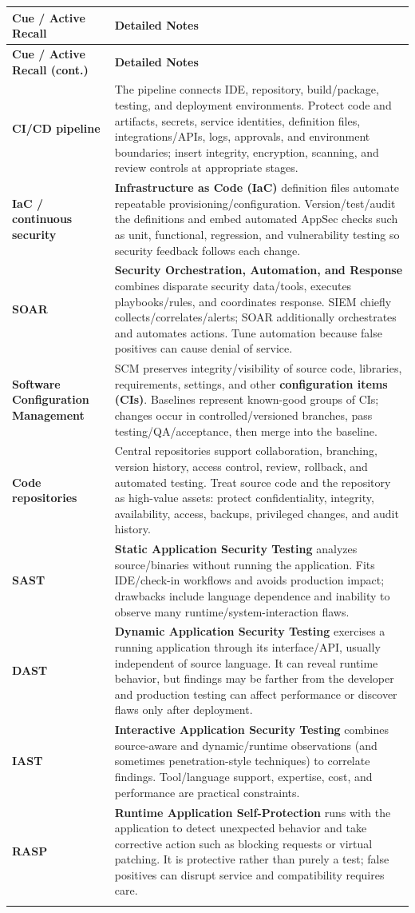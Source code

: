 \documentclass[10pt,letterpaper]{article}
\makeatletter
\newenvironment{cornell}{\rowcolors{2}{white}{notebg}\begin{longtable}{@{}>{\raggedright\arraybackslash\columncolor{cuebg}\color{navy}\bfseries}p{0.285\textwidth}>{\raggedright\arraybackslash}p{0.65\textwidth}@{}}\rowcolor{navy}\color{white}\textbf{Cue / Active Recall} & \color{white}\textbf{Detailed Notes}\\ \hline\endfirsthead\rowcolor{navy}\color{white}\textbf{Cue / Active Recall (cont.)} & \color{white}\textbf{Detailed Notes}\\ \hline\endhead}{\end{longtable}}
\newcommand{\noterow}[2]{#1 & #2\\\arrayrulecolor{line}\hline}\newcommand{\source}[1]{\par{\footnotesize\color{teal}\textit{Source: CBK, #1}}\par}
\makeatother
\begin{document}
\begin{cornell}
\noterow{CI/CD pipeline}{The pipeline connects IDE, repository, build/package, testing, and deployment environments. Protect code and artifacts, secrets, service identities, definition files, integrations/APIs, logs, approvals, and environment boundaries; insert integrity, encryption, scanning, and review controls at appropriate stages.}
\noterow{IaC / continuous security}{\textbf{Infrastructure as Code (IaC)} definition files automate repeatable provisioning/configuration. Version/test/audit the definitions and embed automated AppSec checks such as unit, functional, regression, and vulnerability testing so security feedback follows each change.}
\noterow{SOAR}{\textbf{Security Orchestration, Automation, and Response} combines disparate security data/tools, executes playbooks/rules, and coordinates response. SIEM chiefly collects/correlates/alerts; SOAR additionally orchestrates and automates actions. Tune automation because false positives can cause denial of service.}
\noterow{Software Configuration Management}{SCM preserves integrity/visibility of source code, libraries, requirements, settings, and other \textbf{configuration items (CIs)}. Baselines represent known-good groups of CIs; changes occur in controlled/versioned branches, pass testing/QA/acceptance, then merge into the baseline.}
\noterow{Code repositories}{Central repositories support collaboration, branching, version history, access control, review, rollback, and automated testing. Treat source code and the repository as high-value assets: protect confidentiality, integrity, availability, access, backups, privileged changes, and audit history.}
\noterow{SAST}{\textbf{Static Application Security Testing} analyzes source/binaries without running the application. Fits IDE/check-in workflows and avoids production impact; drawbacks include language dependence and inability to observe many runtime/system-interaction flaws.}
\noterow{DAST}{\textbf{Dynamic Application Security Testing} exercises a running application through its interface/API, usually independent of source language. It can reveal runtime behavior, but findings may be farther from the developer and production testing can affect performance or discover flaws only after deployment.}
\noterow{IAST}{\textbf{Interactive Application Security Testing} combines source-aware and dynamic/runtime observations (and sometimes penetration-style techniques) to correlate findings. Tool/language support, expertise, cost, and performance are practical constraints.}
\noterow{RASP}{\textbf{Runtime Application Self-Protection} runs with the application to detect unexpected behavior and take corrective action such as blocking requests or virtual patching. It is protective rather than purely a test; false positives can disrupt service and compatibility requires care.}
\end{cornell}
\end{document}
